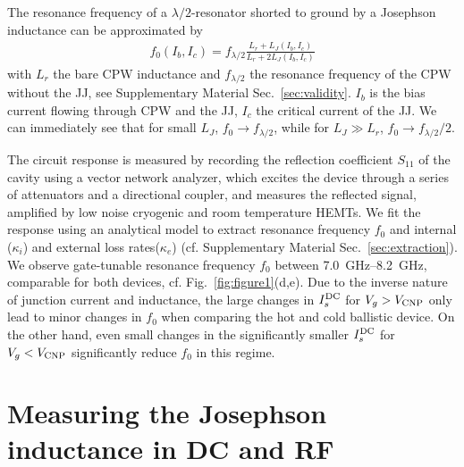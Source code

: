 The resonance frequency of a $\lambda/2$-resonator shorted to ground by a Josephson inductance can be approximated by
\begin{align}
f_0\left(I_b,I_c\right) = f_{\lambda/2} \frac{L_r+L_J\left(I_b, I_c\right)}{L_r +  2L_J\left(I_b, I_c\right)}
\label{eq:Pogorzalek}
\end{align}
%
with $L_r$ the bare CPW inductance and $f_{\lambda/2}$ the resonance frequency of the CPW without the JJ, see Supplementary Material Sec.~\ref{sec:validity}.
%
$I_b$ is the bias current flowing through CPW and the JJ, $I_c$ the critical current of the JJ.
%
We can immediately see that for small $L_J$, $f_0\rightarrow f_{\lambda/2}$, while for $L_J\gg L_r$, $f_0 \rightarrow f_{\lambda/2}/2$.

The circuit response is measured by recording the reflection coefficient $S_{11}$ of the cavity using a vector network analyzer, which excites the device through a series of attenuators and a directional coupler, and measures the reflected signal, amplified by low noise cryogenic and room temperature HEMTs. 
%
We fit the response using an analytical model to extract resonance frequency $f_0$ and internal ($\kappa_i$) and external loss rates($\kappa_e$) (cf. Supplementary Material Sec.~\ref{sec:extraction}).
%
We observe gate-tunable resonance frequency $f_0$ between \SIrange{7.0}{8.2}{\giga\hertz}, comparable for both devices, cf. Fig.~\ref{fig:figure1}(d,e).
%
Due to the inverse nature of junction current and inductance, the large changes in $I_s^{\rm DC}$ for $V_g>V_{\rm CNP}$ only lead to minor changes in $f_0$ when comparing the hot and cold ballistic device.
%
On the other hand, even small changes in the significantly smaller $I_s^{\rm DC}$ for $V_g<V_{\rm CNP}$ significantly reduce $f_0$ in this regime.

\section{Measuring the Josephson inductance in DC and RF}

